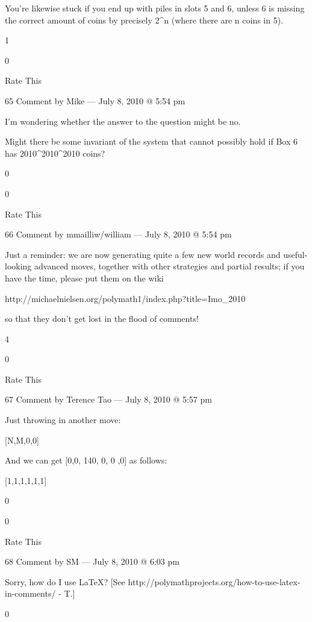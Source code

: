     You’re likewise stuck if you end up with piles in slots 5 and 6, unless 6 is missing the correct amount of coins by precisely 2^n (where there are n coins in 5).
     
    1
     
    0
     
    Rate This

   65 Comment by Mike — July 8, 2010 @ 5:54 pm

    I’m wondering whether the answer to the question might be no.

    Might there be some invariant of the system that cannot possibly hold if Box 6 has 2010^2010^2010 coins?
     
    0
     
    0
     
    Rate This

    66 Comment by mmailliw/william — July 8, 2010 @ 5:54 pm

    Just a reminder: we are now generating quite a few new world records and useful-looking advanced moves, together with other strategies and partial results; if you have the time, please put them on the wiki

    http://michaelnielsen.org/polymath1/index.php?title=Imo_2010

    so that they don’t get lost in the flood of comments!
     
    4
     
    0
     
    Rate This

    67 Comment by Terence Tao — July 8, 2010 @ 5:57 pm

    Just throwing in another move:

    [N,M,0,0] \to [N-1, 1, 0, 2^{M+1}] \to [N-2,2^{M+1}, 0, 0 ]

    And we can get [0,0, 140, 0, 0 ,0] as follows:

    [1,1,1,1,1,1] \to [0,2,2,2,2,3] \to [0,2,1,1,8,3] \to [0,2,1,1,0,19] \to [0,1,19,0,0,0] \to [0,1,1,36,0,0] \to [0,1,1,1,0,140] \to [0,0,140,0,0,0]
     
    0
     
    0
     
    Rate This

    68 Comment by SM — July 8, 2010 @ 6:03 pm

        Sorry, how do I use LaTeX? [See http://polymathprojects.org/how-to-use-latex-in-comments/ - T.]
         
        0
         
